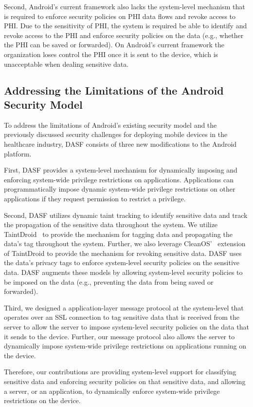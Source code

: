 Second, Android's current framework also lacks the
system-level mechanism that is required to enforce security
policies on PHI data flows and revoke access to PHI.  Due to
the sensitivity of PHI, the system is required be able to
identify and revoke access to the PHI and enforce security policies
on the data (e.g., whether the PHI can be saved or forwarded).
On Android's current framework the organization loses
control the PHI once it is sent to the device, which is
unacceptable when dealing sensitive data.

\subsection{Addressing the Limitations of the Android Security Model}

To address the limitations of Android's existing security model and
the previously discussed security challenges for deploying
mobile devices in the healthcare industry, DASF consists of three new modifications to the Android platform.

First, DASF provides a system-level
mechanism for dynamically imposing and enforcing system-wide
privilege restrictions on applications.  Applications can
programmatically impose dynamic system-wide privilege restrictions
on other applications if they request permission to restrict a
privilege.

Second, DASF utilizes dynamic taint tracking to identify sensitive
data and track the propagation of the sensitive data throughout
the system.  We utilize TaintDroid~\cite{taintdroid} to provide
the mechanism for tagging data and propagating the data's tag
throughout the system.  Further, we also leverage CleanOS'~\cite{Tang_osdi12} 
extension of TaintDroid to provide the mechanism
for revoking sensitive data.  DASF uses the data's privacy
tags to enforce system-level security policies on the sensitive
data.  DASF augments these models by allowing
system-level security policies to be imposed on the data
(e.g., preventing the data from being saved or forwarded).

Third, we designed a application-layer message protocol at the
system-level that operates over an SSL connection to tag sensitive
data that is received from the server to allow the server to
impose system-level security policies on the data that it sends
to the device.  Further, our message protocol also allows the
server to dynamically impose system-wide privilege restrictions
on applications running on the device.

Therefore, our contributions are providing system-level support for
classifying sensitive data and enforcing security policies on that
sensitive data, and allowing a server, or an application, to dynamically
enforce system-wide privilege restrictions on the device.

